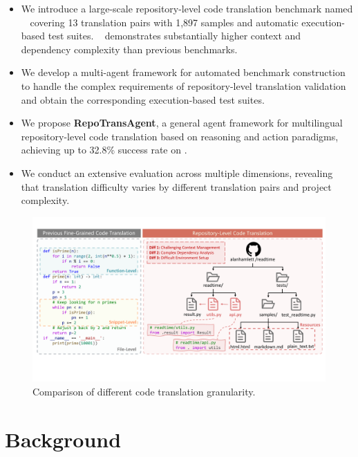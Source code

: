 \begin{itemize}[left=10pt]
    \item We introduce a large-scale repository-level code translation benchmark named \textbf{\toolname~} covering 13 translation pairs with 1,897 samples and automatic execution-based test suites. \toolname~ demonstrates substantially higher context and dependency complexity than previous benchmarks.
    \item We develop a multi-agent framework for automated benchmark construction to handle the complex requirements of repository-level translation validation and obtain the corresponding execution-based test suites.
    \item We propose \textbf{RepoTransAgent}, a general agent framework for multilingual repository-level code translation based on reasoning and action paradigms, achieving up to 32.8\% success rate on \toolname.
    \item We conduct an extensive evaluation across multiple dimensions, revealing that translation difficulty varies by different translation pairs and project complexity.
\end{itemize}


\begin{figure}
    \centering
    \includegraphics[width=\linewidth]{figures/TranslationLevel.pdf}
    \caption{Comparison of different code translation granularity.}
    \label{fig:TranslationLevel}
\end{figure}

\vspace{-10pt}
\section{Background}
